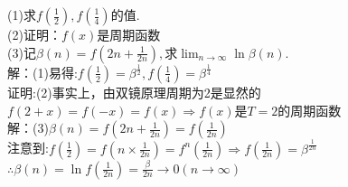 \documentclass[a4paper,11pt,UTF8]{article}
\begin{document}
(1)$\displaystyle\text{求}f{\left(\frac12\right)},f{\left(\frac14\right)}\text{的值}.$\\
(2)证明：$f(x)$是周期函数\\
(3)$\displaystyle\text{记}\beta(n)=f\left(2n+\frac1{2n}\right),\text{求}\lim_{n\to\infty}\ln\beta(n).$\\
解：(1)易得:$\displaystyle f(\frac{1}{2})=\beta^\frac{1}{2},f(\frac{1}{4})=\beta^\frac{1}{4}$\\
证明:(2)事实上，由双镜原理周期为2是显然的\\
$f(2+x)=f(-x)=f(x)\Rightarrow f(x)\text{是}T=2\text{的周期函数}$\\
解：(3)$\displaystyle\beta(n)=f\left(2n+\frac1{2n}\right)=f(\frac{1}{2n})$\\
注意到:$\displaystyle f(\frac{1}{2})=f(n\times\frac{1}{2n})=f^n(\frac{1}{2n})\Rightarrow f(\frac{1}{2n})=\beta^{\frac{1}{2n}}$\\
$\displaystyle\therefore \beta(n)=\ln f(\frac{1}{2n})=\frac{\beta}{2n}\rightarrow0(n\to\infty)$
\end{document}
